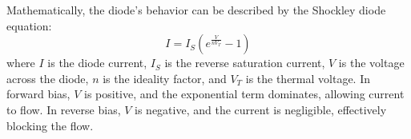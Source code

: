 Mathematically, the diode's behavior can be described by the Shockley diode equation:
\[
I = I_S \left( e^{\frac{V}{nV_T}} - 1 \right)
\]
where \( I \) is the diode current, \( I_S \) is the reverse saturation current, \( V \) is the voltage across the diode, \( n \) is the ideality factor, and \( V_T \) is the thermal voltage. In forward bias, \( V \) is positive, and the exponential term dominates, allowing current to flow. In reverse bias, \( V \) is negative, and the current is negligible, effectively blocking the flow.

